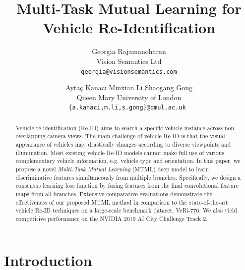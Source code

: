 \documentclass[10pt,twocolumn,letterpaper]{article}
\begin{document}
\title{Multi-Task Mutual Learning for Vehicle Re-Identification}

\author{Georgia Rajamanoharan\\
Vision Semantics Ltd\\
{\tt\small georgia@visionsemantics.com}
\and
Ayta\c{c} Kanac\i \hspace{0.7cm}
Minxian Li  \hspace{0.7cm}
Shaogang Gong\\
Queen Mary University of London\\
{\tt\small \{a.kanaci,m.li,s.gong\}@qmul.ac.uk }
}

\maketitle

\begin{abstract}
Vehicle re-identification (Re-ID) aims to search a specific vehicle
instance across non-overlapping camera views.
%
The main challenge of vehicle Re-ID is that
the visual appearance of vehicles may drastically changes
according to diverse viewpoints and illumination.
%
Most existing vehicle Re-ID models cannot make full use of
various complementary vehicle information, e.g. vehicle type and orientation.
%
In this paper, we propose a novel {\em Multi-Task Mutual Learning} (MTML) deep model
to learn discriminative features simultaneously from multiple branches.
%
Specifically, we design a consensus learning loss function by fusing features from the final convolutional feature maps from all branches.
%
Extensive comparative evaluations demonstrate the effectiveness of our
proposed MTML method in comparison to the state-of-the-art vehicle Re-ID techniques on a large-scale benchmark dataset, VeRi-776.
We also yield competitive performance on the NVIDIA 2019 AI City Challenge Track 2.
\end{abstract}

\section{Introduction}
\end{document}
